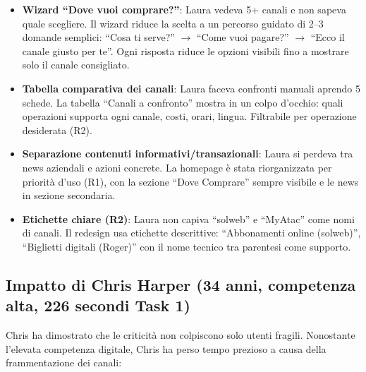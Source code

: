 \begin{itemize}
    \item \textbf{Wizard ``Dove vuoi comprare?''}: Laura vedeva 5+ canali e non sapeva quale scegliere. Il wizard riduce la scelta a un percorso guidato di 2--3 domande semplici: ``Cosa ti serve?'' $\rightarrow$ ``Come vuoi pagare?'' $\rightarrow$ ``Ecco il canale giusto per te''. Ogni risposta riduce le opzioni visibili fino a mostrare solo il canale consigliato.
    \item \textbf{Tabella comparativa dei canali}: Laura faceva confronti manuali aprendo 5 schede. La tabella ``Canali a confronto'' mostra in un colpo d'occhio: quali operazioni supporta ogni canale, costi, orari, lingua. Filtrabile per operazione desiderata (R2).
    \item \textbf{Separazione contenuti informativi/transazionali}: Laura si perdeva tra news aziendali e azioni concrete. La homepage \`e stata riorganizzata per priorit\`a d'uso (R1), con la sezione ``Dove Comprare'' sempre visibile e le news in sezione secondaria.
    \item \textbf{Etichette chiare (R2)}: Laura non capiva ``solweb'' e ``MyAtac'' come nomi di canali. Il redesign usa etichette descrittive: ``Abbonamenti online (solweb)'', ``Biglietti digitali (Roger)'' con il nome tecnico tra parentesi come supporto.
\end{itemize}

\subsection{Impatto di Chris Harper (34 anni, competenza alta, 226 secondi Task 1)}

Chris ha dimostrato che le criticit\`a non colpiscono solo utenti fragili. Nonostante l'elevata competenza digitale, Chris ha perso tempo prezioso a causa della frammentazione dei canali:

